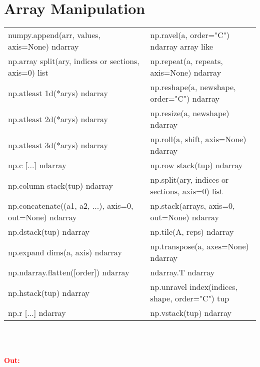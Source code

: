 \section*{Array Manipulation}
\hspace{1cm}
\begin{tabular}{|l l|}
	\hline
	  numpy.append(arr, values, axis=None) ndarray & np.ravel(a, order="C") ndarray array like
	\\np.array split(ary, indices or sections, axis=0) list &np.repeat(a, repeats, axis=None) ndarray
	\\np.atleast 1d(*arys) ndarray &np.reshape(a, newshape, order="C") ndarray
	\\np.atleast 2d(*arys) ndarray &np.resize(a, newshape) ndarray
	\\np.atleast 3d(*arys) ndarray &np.roll(a, shift, axis=None) ndarray
	\\np.c [...] ndarray &np.row stack(tup) ndarray
	\\np.column stack(tup) ndarray &np.split(ary, indices or sections, axis=0) list
	\\np.concatenate((a1, a2, ...), axis=0, out=None) ndarray &np.stack(arrays, axis=0, out=None) ndarray
	\\np.dstack(tup) ndarray &np.tile(A, reps) ndarray
	\\np.expand dims(a, axis) ndarray &np.transpose(a, axes=None) ndarray
	\\np.ndarray.flatten([order]) ndarray &ndarray.T ndarray
	\\np.hstack(tup) ndarray &np.unravel index(indices, shape, order="C") tup
	\\np.r [...] ndarray &np.vstack(tup) ndarray

	\\\hline
\end{tabular}
\\
\vspace{0.5cm}
\\\vspace{0.1cm}
\begin{minipage}[h]{10cm}
	
\end{minipage}
\begin{minipage}[h]{8cm}
	\textcolor{red}{\textbf{Out:}}

\end{minipage}

